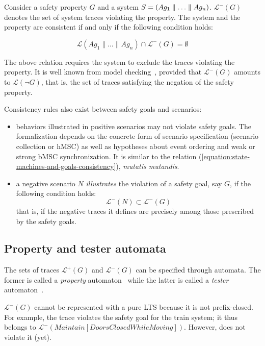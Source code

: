 Consider a safety property $G$ and a system $S = (Ag_1 \parallel \ldots \parallel Ag_n)$. $\mathcal{L}^{-}(G)$ denotes the set of system traces violating the property. The system and the property are consistent if and only if the following condition holds:

\begin{equation}
\mathcal{L}(Ag_1 \parallel \ldots \parallel Ag_n) \cap \mathcal{L}^{-}(G) = \emptyset
\label{equation:state-machines-and-goals-consistency}
\end{equation}

The above relation requires the system to exclude the traces violating the property. It is well known from model checking~\cite{Clarke:1989}, provided that $\mathcal{L}^{-}(G)$ amounts to $\mathcal{L}(\neg G)$, that is, the set of traces satisfying the negation of the safety property. 

Consistency rules also exist between safety goals and scenarios:

\begin{itemize}
\item behaviors illustrated in positive scenarios may not violate safety goals. The formalization depends on the concrete form of scenario specification (scenario collection or hMSC) as well as hypotheses about event ordering and weak or strong bMSC synchronization. It is similar to the relation (\ref{equation:state-machines-and-goals-consistency}), \emph{mutatis mutandis}.
\item a negative scenario $N$ \emph{illustrates} the violation of a safety goal, say $G$, if the following condition holds:
\begin{equation}
\mathcal{L}^{-}(N) \subset \mathcal{L}^{-}(G)
\end{equation}
\noindent that is, if the negative traces it defines are precisely among those prescribed by the safety goals.
\end{itemize}

\subsection{Property and tester automata\label{subsection:background-property-and-tester-automata}}

The sets of traces $\mathcal{L}^{+}(G)$ and $\mathcal{L}^{-}(G)$ can be specified through automata. The former is called a \emph{property} automaton~\cite{Letier:2005, Letier:2008} while the latter is called a \emph{tester} automaton~\cite{Giannakopoulou:2003}.

$\mathcal{L}^{-}(G)$ cannot be represented with a pure LTS because it is not prefix-closed. For example, the trace  violates the safety goal for the train system; it thus belongs to $\mathcal{L}^{-}(Maintain[DoorsClosed While Moving])$. However,  does not violate it (yet). 

